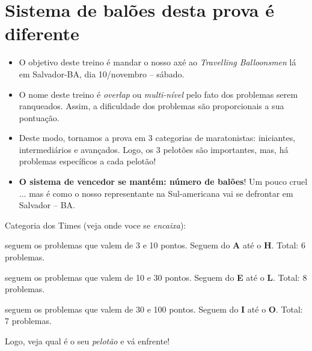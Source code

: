 \documentclass[12pt,oneside]{article}
\begin{document}
\newpage
\section{Sistema de balões desta prova é diferente}


\begin{itemize}
\itemsep -1pt

\item O objetivo deste treino é mandar o nosso axé ao \emph{Travelling
Balloonsmen} lá em Salvador-BA, dia 10/novembro -- sábado.

\item O nome deste treino é \emph{overlap} ou  \emph{multi-nível} pelo fato dos problemas serem ranqueados. Assim, a dificuldade dos problemas são proporcionais a sua pontuação.

\item Deste modo, tornamos a prova em 3 categorias de maratonistas: iniciantes, intermediários e avançados. Logo, os 3 pelotões são importantes, mas, há problemas específicos a cada pelotão!

\item \textbf{O sistema de vencedor se mantém: número de balões}! Um pouco cruel ... mas é como o nosso representante na Sul-americana vai se defrontar em Salvador -- BA.

\end{itemize}

Categoria dos Times (veja onde voce se \emph{encaixa}):

\begin{description}
\itemsep -1pt

\item [Iniciantes (times da série C):] seguem os problemas que valem de  3 e 10 pontos. Seguem do \textbf{A} até o \textbf{H}.  Total: 6 problemas.

\item [Intermediário  (times da série B):]  seguem os problemas que valem de  10 e 30 pontos.  Seguem do \textbf{E} até o \textbf{L}. Total: 8 problemas.

\item [Avançado  (times da série A):]  seguem os problemas que valem de  30 e 100 pontos.  Seguem do \textbf{I} até o \textbf{O}. Total: 7 problemas.

\end{description}

Logo, veja qual é o seu \emph{pelotão} e vá enfrente!

 
\end{document}

